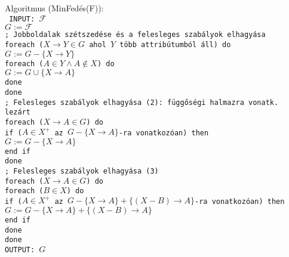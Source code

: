 \documentclass[fleqn,10pt,a4paper]{article}
\newcommand{\F}{\mathcal{F}}
\theoremstyle{magyar}
\begin{document}
  \noindent Algoritmus (MinFedés(F)):\\
  \texttt{
    \hspace*{0.3cm} INPUT: $\F$\\
    \hspace*{0.3cm} $G:= \F$\\
    \hspace*{0.3cm} ; Jobboldalak szétszedése és a felesleges szabályok elhagyása\\
    \hspace*{0.3cm} foreach ($X\to Y\in G $ ahol $Y$ több attribútumból áll) do\\
    \hspace*{0.7cm} $G  := G - \{X\to Y\}$\\
    \hspace*{0.7cm} foreach ($A\in Y\land A\not\in X$) do\\
    \hspace*{1.1cm} $G := G \cup \{ X\to A\}$\\
    \hspace*{0.7cm} done\\
    \hspace*{0.3cm} done\\    
    \hspace*{0.3cm} ; Felesleges szabályok elhagyása (2): függőségi halmazra vonatk. lezárt\\
    \hspace*{0.3cm} foreach ($X\to A\in G $) do\\
    \hspace*{0.7cm} if ($A\in X^+$ az $G-\{X\to A\}$-ra vonatkozóan) then\\
    \hspace*{1.1cm} $G := G - \{ X\to A\}$\\
    \hspace*{0.7cm} end if\\
    \hspace*{0.3cm} done\\
    \hspace*{0.3cm} ; Felesleges szabályok elhagyása (3)\\
    \hspace*{0.3cm} foreach ($X\to A\in G$) do\\
    \hspace*{0.7cm} foreach ($B\in X$) do\\
    \hspace*{1.1cm} if ($A\in X^+$ az $G-\{X\to A\} + \{(X-B)\to A\}$-ra vonatkozóan) then\\
    \hspace*{1.5cm} $G := G-\{X\to A\} + \{(X-B)\to A\}$\\
    \hspace*{1.1cm} end if\\
    \hspace*{0.7cm} done\\
    \hspace*{0.3cm} done\\
    \hspace*{0.3cm} OUTPUT: $G$}
  
\end{document}
